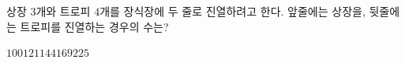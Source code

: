 \hspace*{2mm}\begin{minipage}[t]{\dimexpr\linewidth-2mm\relax}\vspace{0pt}
상장 $3$개와 트로피 $4$개를 장식장에 두 줄로 진열하려고 한다. 앞줄에는 상장을, 뒷줄에는 트로피를 진열하는 경우의 수는?
\begin{choices32}{$100$}{$121$}{$144$}{$169$}{$225$}\end{choices32}\end{minipage}
